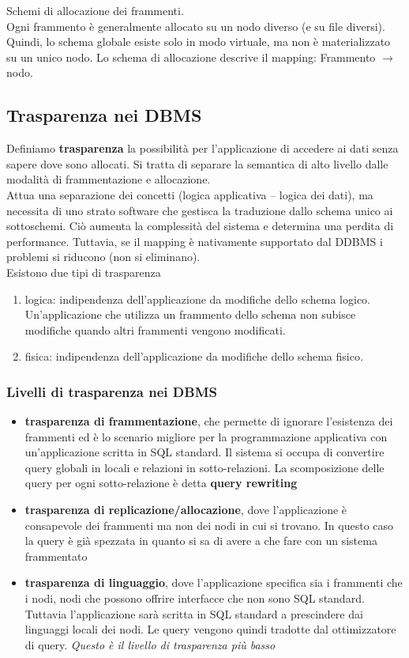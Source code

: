Schemi di allocazione dei frammenti.\\
Ogni frammento è generalmente allocato su un nodo diverso (e su file diversi). Quindi, lo schema globale esiste solo in modo virtuale, ma non è materializzato su un unico nodo. Lo schema di allocazione descrive il mapping: Frammento $\to$ nodo.

\subsection{Trasparenza nei DBMS}
Definiamo \textbf{trasparenza} la possibilità per l'applicazione di accedere ai dati senza sapere dove sono allocati. Si tratta di separare la semantica di alto livello dalle modalità di frammentazione e allocazione.\\
Attua una separazione dei concetti (logica applicativa – logica dei dati), ma necessita di uno strato software che gestisca la traduzione dallo schema unico ai sottoschemi. Ciò aumenta la complessità del sistema e determina una perdita di performance. Tuttavia, se il mapping è nativamente supportato dal DDBMS i problemi si riducono (non si eliminano).\\
Esistono due tipi di trasparenza 
\begin{enumerate}
    \item logica: indipendenza dell’applicazione da modifiche dello schema logico. Un’applicazione che utilizza un frammento dello schema non subisce modifiche quando altri frammenti vengono modificati.
    \item fisica: indipendenza dell’applicazione da modifiche dello schema fisico.
\end{enumerate}

\subsubsection{Livelli di trasparenza nei DBMS}
\begin{itemize} 
    \item \textbf{trasparenza di frammentazione}, che permette di ignorare l'esistenza dei frammenti ed è lo scenario migliore per la programmazione applicativa con un'applicazione scritta in SQL standard. Il sistema si occupa di convertire query globali in locali e relazioni in sotto-relazioni. La scomposizione delle query per ogni sotto-relazione è detta \textbf{query rewriting} 
    \item \textbf{trasparenza di replicazione/allocazione}, dove l'applicazione è consapevole dei frammenti ma non dei nodi in cui si trovano. In questo caso la query è già spezzata in quanto si sa di avere a che fare con un sistema frammentato 
    \item \textbf{trasparenza di linguaggio}, dove l'applicazione specifica sia i frammenti che i nodi, nodi che possono offrire interfacce che non sono SQL standard. Tuttavia l'applicazione sarà scritta in SQL standard a prescindere dai linguaggi locali dei nodi. Le query vengono quindi tradotte dal ottimizzatore di query. \textit{Questo è il livello di trasparenza più basso} 
\end{itemize}